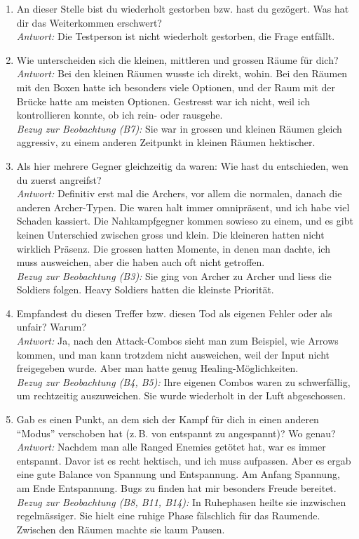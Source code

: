 \documentclass[../Main.tex]{subfiles}
\begin{document}
\begin{enumerate}[label=\textbf{I\arabic*}, leftmargin=1.5cm, itemsep=1em]
\item An dieser Stelle bist du wiederholt gestorben bzw. hast du gezögert. Was hat dir das Weiterkommen erschwert? \\
\textit{Antwort:} Die Testperson ist nicht wiederholt gestorben, die Frage entfällt.

\item Wie unterscheiden sich die kleinen, mittleren und grossen Räume für dich? \\
\textit{Antwort:} Bei den kleinen Räumen wusste ich direkt, wohin. Bei den Räumen mit den Boxen hatte ich besonders viele Optionen, und der Raum mit der Brücke hatte am meisten Optionen. Gestresst war ich nicht, weil ich kontrollieren konnte, ob ich rein- oder rausgehe. \\
\textit{Bezug zur Beobachtung (B7):} Sie war in grossen und kleinen Räumen gleich aggressiv, zu einem anderen Zeitpunkt in kleinen Räumen hektischer.

\item Als hier mehrere Gegner gleichzeitig da waren: Wie hast du entschieden, wen du zuerst angreifst? \\
\textit{Antwort:} Definitiv erst mal die Archers, vor allem die normalen, danach die anderen Archer-Typen. Die waren halt immer omnipräsent, und ich habe viel Schaden kassiert. Die Nahkampfgegner kommen sowieso zu einem, und es gibt keinen Unterschied zwischen gross und klein. Die kleineren hatten nicht wirklich Präsenz. Die grossen hatten Momente, in denen man dachte, ich muss ausweichen, aber die haben auch oft nicht getroffen. \\
\textit{Bezug zur Beobachtung (B3):} Sie ging von Archer zu Archer und liess die Soldiers folgen. Heavy Soldiers hatten die kleinste Priorität.

\item Empfandest du diesen Treffer bzw. diesen Tod als eigenen Fehler oder als unfair? Warum? \\
\textit{Antwort:} Ja, nach den Attack-Combos sieht man zum Beispiel, wie Arrows kommen, und man kann trotzdem nicht ausweichen, weil der Input nicht freigegeben wurde. Aber man hatte genug Healing-Möglichkeiten. \\
\textit{Bezug zur Beobachtung (B4, B5):} Ihre eigenen Combos waren zu schwerfällig, um rechtzeitig auszuweichen. Sie wurde wiederholt in der Luft abgeschossen.

\item Gab es einen Punkt, an dem sich der Kampf für dich in einen anderen \enquote{Modus} verschoben hat (z.\,B. von entspannt zu angespannt)? Wo genau? \\
\textit{Antwort:} Nachdem man alle Ranged Enemies getötet hat, war es immer entspannt. Davor ist es recht hektisch, und ich muss aufpassen. Aber es ergab eine gute Balance von Spannung und Entspannung. Am Anfang Spannung, am Ende Entspannung. Bugs zu finden hat mir besonders Freude bereitet. \\
\textit{Bezug zur Beobachtung (B8, B11, B14):} In Ruhephasen heilte sie inzwischen regelmässiger. Sie hielt eine ruhige Phase fälschlich für das Raumende. Zwischen den Räumen machte sie kaum Pausen.


\end{enumerate}
\end{document}
